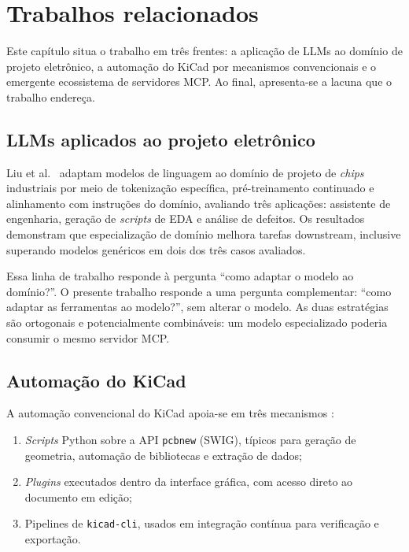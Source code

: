\chapter{Trabalhos relacionados}\label{cap:relacionados}

Este capítulo situa o trabalho em três frentes: a aplicação de LLMs ao
domínio de projeto eletrônico, a automação do KiCad por mecanismos
convencionais e o emergente ecossistema de servidores MCP. Ao final,
apresenta-se a lacuna que o trabalho endereça.

\section{LLMs aplicados ao projeto eletrônico}

Liu et al.~\cite{liu2023chipnemo} adaptam modelos de linguagem ao domínio de projeto de
\emph{chips} industriais por meio de tokenização específica, pré-treinamento
continuado e alinhamento com instruções do domínio, avaliando três aplicações:
assistente de engenharia, geração de \emph{scripts} de EDA e análise de
defeitos. Os resultados demonstram que especialização de domínio melhora
tarefas downstream, inclusive superando modelos genéricos em dois dos três
casos avaliados.

Essa linha de trabalho responde à pergunta ``como adaptar o modelo ao
domínio?''. O presente trabalho responde a uma pergunta complementar: ``como
adaptar as ferramentas ao modelo?'', sem alterar o modelo. As duas estratégias
são ortogonais e potencialmente combináveis: um modelo especializado poderia
consumir o mesmo servidor MCP.

\section{Automação do KiCad}

A automação convencional do KiCad apoia-se em três mecanismos
\citep{swig,kicaddev,kicadcli}:

\begin{enumerate}[leftmargin=1.4em,itemsep=0.2em]
  \item \emph{Scripts} Python sobre a API \texttt{pcbnew} (SWIG), típicos para
        geração de geometria, automação de bibliotecas e extração de dados;
  \item \emph{Plugins} executados dentro da interface gráfica, com acesso
        direto ao documento em edição;
  \item Pipelines de \texttt{kicad-cli}, usados em integração contínua para
        verificação e exportação.
\end{enumerate}

